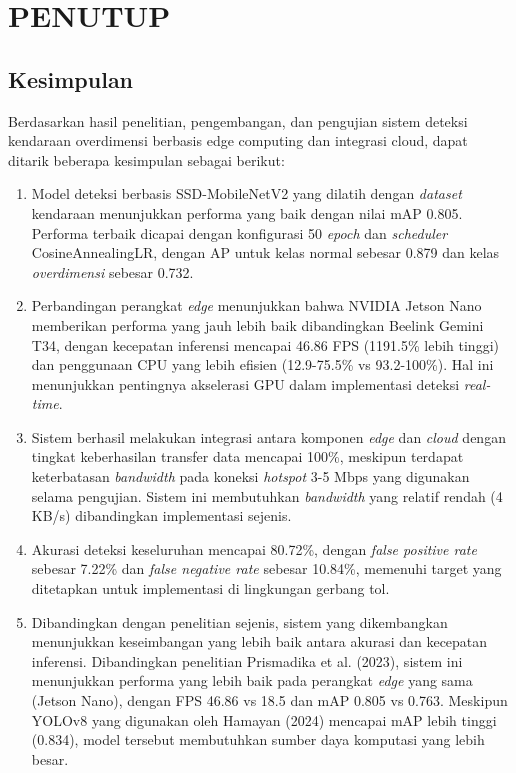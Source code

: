 \chapter{PENUTUP}
\label{chap:penutup}


\section{Kesimpulan}
\label{sec:kesimpulan}

Berdasarkan hasil penelitian, pengembangan, dan pengujian sistem deteksi kendaraan overdimensi berbasis edge computing dan integrasi cloud, dapat ditarik beberapa kesimpulan sebagai berikut:

\begin{enumerate}[nolistsep]

  \item Model deteksi berbasis SSD-MobileNetV2 yang dilatih dengan \emph{dataset} kendaraan menunjukkan performa yang baik dengan nilai mAP 0.805. Performa terbaik dicapai dengan konfigurasi 50 \emph{epoch} dan \emph{scheduler} CosineAnnealingLR, dengan AP untuk kelas normal sebesar 0.879 dan kelas \emph{overdimensi} sebesar 0.732.

  \item Perbandingan perangkat \emph{edge} menunjukkan bahwa NVIDIA Jetson Nano memberikan performa yang jauh lebih baik dibandingkan Beelink Gemini T34, dengan kecepatan inferensi mencapai 46.86 FPS (1191.5\% lebih tinggi) dan penggunaan CPU yang lebih efisien (12.9-75.5\% vs 93.2-100\%). Hal ini menunjukkan pentingnya akselerasi GPU dalam implementasi deteksi \emph{real-time}.

  \item Sistem berhasil melakukan integrasi antara komponen \emph{edge} dan \emph{cloud} dengan tingkat keberhasilan transfer data mencapai 100\%, meskipun terdapat keterbatasan \emph{bandwidth} pada koneksi \emph{hotspot} 3-5 Mbps yang digunakan selama pengujian. Sistem ini membutuhkan \emph{bandwidth} yang relatif rendah (4 KB/s) dibandingkan implementasi sejenis.

  \item Akurasi deteksi keseluruhan mencapai 80.72\%, dengan \emph{false positive rate} sebesar 7.22\% dan \emph{false negative rate} sebesar 10.84\%, memenuhi target yang ditetapkan untuk implementasi di lingkungan gerbang tol.
  
  \item Dibandingkan dengan penelitian sejenis, sistem yang dikembangkan menunjukkan keseimbangan yang lebih baik antara akurasi dan kecepatan inferensi. Dibandingkan penelitian Prismadika et al. (2023), sistem ini menunjukkan performa yang lebih baik pada perangkat \emph{edge} yang sama (Jetson Nano), dengan FPS 46.86 vs 18.5 dan mAP 0.805 vs 0.763. Meskipun YOLOv8 yang digunakan oleh Hamayan (2024) mencapai mAP lebih tinggi (0.834), model tersebut membutuhkan sumber daya komputasi yang lebih besar.
  

\end{enumerate}
